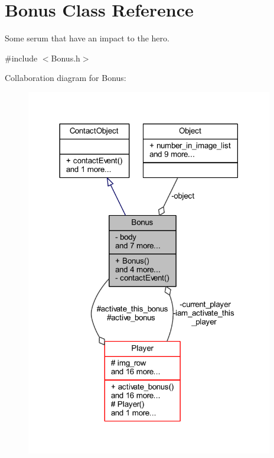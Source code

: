 \hypertarget{class_bonus}{}\section{Bonus Class Reference}
\label{class_bonus}


Some serum that have an impact to the hero.  




{\ttfamily \#include $<$Bonus.\+h$>$}



Collaboration diagram for Bonus\+:
\nopagebreak
\begin{figure}[H]
\begin{center}
\leavevmode
\includegraphics[width=306pt]{class_bonus__coll__graph}
\end{center}
\end{figure}
